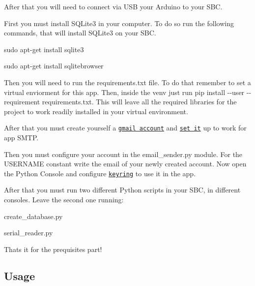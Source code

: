 After that you will need to connect via U\+SB your Arduino to your S\+BC.
\begin{DoxyItemize}
\item First you must install S\+Q\+Lite3 in your computer. To do so run the following commands, that will install S\+Q\+Lite3 on your S\+BC.
\begin{DoxyItemize}
\item {\ttfamily sudo apt-\/get install sqlite3}
\item {\ttfamily sudo apt-\/get install sqlitebrowser}
\end{DoxyItemize}
\item Then you will need to run the requirements.\+txt file. To do that remember to set a virtual enviorment for this app. Then, inside the venv just run {\ttfamily pip install -\/-\/user -\/-\/requirement requirements.\+txt}. This will leave all the required libraries for the project to work readily installed in your virtual environment.
\item After that you must create yourself a \href{https://accounts.google.com/signup/v2/webcreateaccount?flowName=GlifWebSignIn&flowEntry=SignUp}{\tt gmail account} and \href{https://myaccount.google.com/lesssecureapps}{\tt set it} up to work for app S\+M\+TP.
\begin{DoxyItemize}
\item Then you must configure your account in the {\ttfamily email\+\_\+sender.\+py} module. For the {\ttfamily U\+S\+E\+R\+N\+A\+ME} constant write the email of your newly created account. Now open the Python Console and configure \href{https://pypi.org/project/keyring/}{\tt keyring} to use it in the app.
\end{DoxyItemize}
\item After that you must run two different Python scripts in your S\+BC, in different consoles. Leave the second one running\+:
\begin{DoxyItemize}
\item {\ttfamily create\+\_\+database.\+py}
\item {\ttfamily serial\+\_\+reader.\+py}
\end{DoxyItemize}

That\textquotesingle{}s it for the prequisites part!
\end{DoxyItemize}

\subsection*{Usage}

